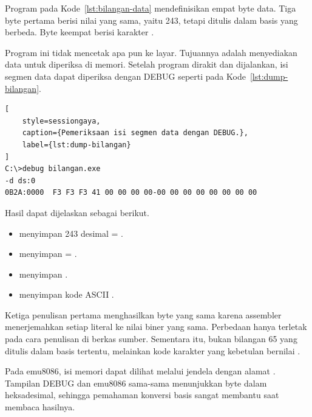Program pada Kode~\ref{lst:bilangan-data} mendefinisikan empat byte
data. Tiga byte pertama berisi nilai yang sama, yaitu 243, tetapi
ditulis dalam basis yang berbeda. Byte keempat berisi karakter
.



Program ini tidak mencetak apa pun ke layar. Tujuannya adalah
menyediakan data untuk diperiksa di memori. Setelah program dirakit
dan dijalankan, isi segmen data dapat diperiksa dengan DEBUG seperti
pada Kode~\ref{lst:dump-bilangan}.

\begin{lstlisting}[
    style=sessiongaya,
    caption={Pemeriksaan isi segmen data dengan DEBUG.},
    label={lst:dump-bilangan}
]
C:\>debug bilangan.exe
-d ds:0
0B2A:0000  F3 F3 F3 41 00 00 00 00-00 00 00 00 00 00 00 00
\end{lstlisting}

Hasil  dapat dijelaskan sebagai berikut.

\begin{itemize}
    \item {} menyimpan 243 desimal = .
    \item {} menyimpan  =
          .
    \item {} menyimpan .
    \item {} menyimpan kode ASCII .
\end{itemize}

Ketiga penulisan pertama menghasilkan byte yang sama karena
assembler menerjemahkan setiap literal ke nilai biner yang sama.
Perbedaan hanya terletak pada cara penulisan di berkas sumber.
Sementara itu,  bukan bilangan 65 yang ditulis dalam basis
tertentu, melainkan kode karakter yang kebetulan bernilai .

\begin{infobox}
Pada emu8086, isi memori dapat dilihat melalui jendela
 dengan alamat . Tampilan DEBUG dan
emu8086 sama-sama menunjukkan byte dalam heksadesimal, sehingga
pemahaman konversi basis sangat membantu saat membaca hasilnya.
\end{infobox}
